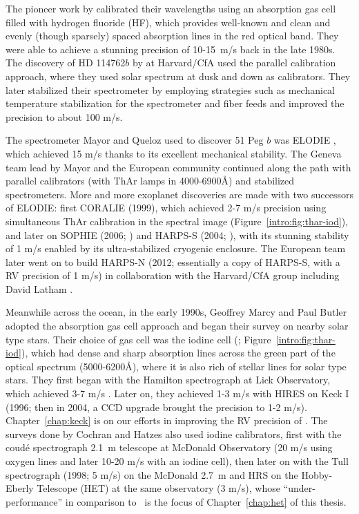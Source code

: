 The pioneer work by \cite{1988ApJ...331..902C} calibrated their
wavelengths using an absorption gas cell filled with hydrogen fluoride
(HF), which provides well-known and clean and evenly (though sparsely)
spaced absorption lines in the red optical band. They were able to
achieve a stunning precision of 10-15~m/s back in the late 1980s. The
discovery of HD 114762$b$ by \cite{1989Natur.339...38L} at Harvard/CfA
used the parallel calibration approach, where they used solar spectrum
at dusk and down as calibrators. They later stabilized their
spectrometer by employing strategies such as mechanical temperature
stabilization for the spectrometer and fiber feeds and improved the
precision to about 100 m/s.

The spectrometer Mayor and Queloz used to discover 51 Peg $b$ was
ELODIE \citep{elodie}, which achieved 15 m/s thanks to its excellent
mechanical stability. The Geneva team lead by Mayor and the European
community continued along the path with parallel calibrators (with
ThAr lamps in 4000-6900\AA) and stabilized spectrometers. More and
more exoplanet discoveries are made with two successors of ELODIE:
first CORALIE (1999), which achieved 2-7 m/s precision using
simultaneous ThAr calibration in the spectral image
(Figure~\ref{intro:fig:thar-iod}), and later on SOPHIE (2006;
\citealt{2008SPIE.7014E..0JP}) and HARPS-S (2004; \citealt{harps-s}),
with its stunning stability of 1 m/s enabled by its ultra-stabilized
cryogenic enclosure. The European team later went on to build HARPS-N
(2012; essentially a copy of HARPS-S, with a RV precision of 1 m/s) in
collaboration with the Harvard/CfA group including David Latham
\citep{2012SPIE.8446E..1VC}. 

Meanwhile across the ocean, in the early 1990s, Geoffrey Marcy and
Paul Butler adopted the absorption gas cell approach and began their
survey on nearby solar type stars. Their choice of gas cell was the
iodine cell (\citealt{1992PASP..104..270M};
Figure~\ref{intro:fig:thar-iod}), which had dense and sharp absorption
lines across the green part of the optical spectrum (5000-6200\AA),
where it is also rich of stellar lines for solar type stars. They
first began with the Hamilton spectrograph at Lick Observatory, which
achieved 3-7 m/s \citep{2014ApJS..210....5F}. Later on, they achieved
1-3 m/s with HIRES on Keck I (1996; then in 2004, a CCD upgrade
brought the precision to 1-2 m/s). Chapter~\ref{chap:keck} is on our
efforts in improving the RV precision of \keck. The surveys done by
Cochran and Hatzes also used iodine calibrators, first with the
coud\'e spectrograph 2.1~m telescope at McDonald Observatory (20 m/s
using oxygen lines and later 10-20 m/s with an iodine cell), then
later on with the Tull spectrograph (1998; 5 m/s) on the McDonald
2.7~m and HRS on the Hobby-Eberly Telescope (HET) at the same
observatory (3 m/s), whose ``under-performance'' in comparison to
\keck\ is the focus of Chapter~\ref{chap:het} of this thesis.

